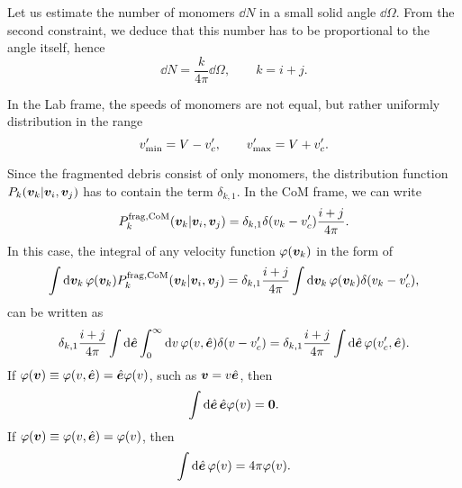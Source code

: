 \documentclass[aps,prl,preprint,groupedaddress,10pt]{revtex4-2}
\begin{document}
Let us estimate the number of monomers $\dd{N}$ in a small solid angle $\dd{\Omega}$.
From the second constraint, we deduce that this number has to be proportional to the
angle itself, hence
\begin{equation}
    \dd{N}=\frac{k}{4\pi}\dd{\Omega},\qquad k=i+j.
\end{equation}

In the Lab frame, the speeds of monomers are not equal, but rather uniformly
distribution in the range
\begin{equation}
    v'_{\mathrm{min}}=V-v'_c,\qquad v'_{\mathrm{max}}=V+v'_c.
\end{equation}

Since the fragmented debris consist of only monomers, the distribution function
$P_k\pqty{\bv_k\vert\bv_i,\bv_j}$ has to contain the term $\delta_{k,1}$.
In the CoM frame, we can write
\begin{equation}
    \utx{P_k}{frag, CoM}\pqty{\bv_k\vert\bv_i,\bv_j}=
    \delta_{k,1}\delta\pqty{v_k-v'_c}\frac{i+j}{4\pi}.
\end{equation}
In this case, the integral of any velocity function $\varphi\pqty{\bv_k}$ in the form of
\begin{equation}
    \int\dd{\bv_k}\varphi\pqty{\bv_k}\utx{P_k}{frag,CoM}\pqty{\bv_k\vert\bv_i,\bv_j}=
    \delta_{k,1}\frac{i+j}{4\pi}\int\dd{\bv_k}\varphi\pqty{\bv_k}\delta\pqty{v_k-v'_c},
\end{equation}
can be written as
\begin{equation}
    \delta_{k,1}\frac{i+j}{4\pi}\int\dd{\be}
    \int_{0}^{\infty}\dd{v}\varphi\pqty{v,\be}\delta\pqty{v-v'_c}=
    \delta_{k,1}\frac{i+j}{4\pi}\int\dd{\be}\varphi\pqty{v'_c,\be}.
\end{equation}
If $\varphi\pqty{\bv}\equiv\varphi\pqty{v,\be}=\be\varphi\pqty{v}$, such as $\vb*{v}=v\hat{\vb*{e}}$,
then
\begin{equation}
    \int\dd{\be}\be\varphi\pqty{v}=\bnull.
\end{equation}
If $\varphi\pqty{\bv}\equiv\varphi\pqty{v,\be}=\varphi\pqty{v}$, then
\begin{equation}
    \int\dd{\be}\varphi\pqty{v}=4\pi\varphi\pqty{v}.
\end{equation}
\end{document}
